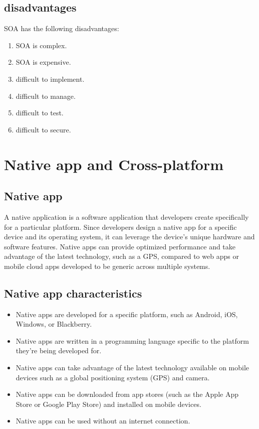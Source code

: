 \documentclass[12pt,a4paper, twosite]{article}
\begin{document}
\subsection{disadvantages}
\label{sec:orgb8b6b9a}
SOA has the following disadvantages:
\begin{enumerate}

\item SOA is complex.
\item SOA is expensive.
\item difficult to implement.
\item difficult to manage.
\item difficult to test.
\item difficult to secure.
\end{enumerate}



\section{Native app and Cross-platform}
\label{sec:orgb8b6b9b}

\subsection{Native app}
\label{sec:orgb8b6b9c}
A native application is a software application that developers create specifically for a particular platform. Since developers design a native app for a specific device and its operating system, it can leverage the device's unique hardware and software features. Native apps can provide optimized performance and take advantage of the latest technology, such as a GPS, compared to web apps or mobile cloud apps developed to be generic across multiple systems.

\subsection*{Native app characteristics}
\label{sec:orgb8b6b2b}

\begin{itemize}
\item Native apps are developed for a specific platform, such as Android, iOS, Windows, or Blackberry.
\item Native apps are written in a programming language specific to the platform they're being developed for.
\item Native apps can take advantage of the latest technology available on mobile devices such as a global positioning system (GPS) and camera.
\item Native apps can be downloaded from app stores (such as the Apple App Store or Google Play Store) and installed on mobile devices.
\item Native apps can be used without an internet connection.
\end{itemize}
\end{document}
